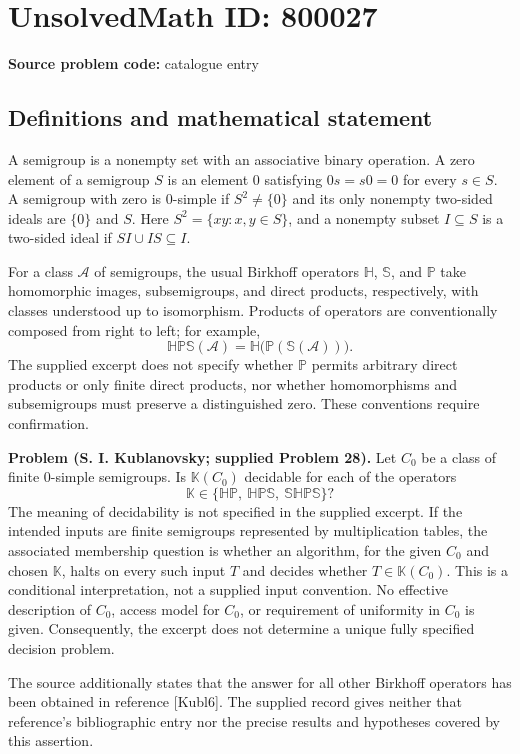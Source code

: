 \documentclass[11pt]{article}
\begin{document}
\section*{UnsolvedMath ID: 800027}
\textbf{Source problem code:} catalogue entry
\subsection{Definitions and mathematical statement}
A semigroup is a nonempty set with an associative binary operation. A zero element of a semigroup \(S\) is an element \(0\) satisfying \(0s=s0=0\) for every \(s\in S\). A semigroup with zero is \(0\)-simple if \(S^2\ne\{0\}\) and its only nonempty two-sided ideals are \(\{0\}\) and \(S\). Here \(S^2=\{xy:x,y\in S\}\), and a nonempty subset \(I\subseteq S\) is a two-sided ideal if \(SI\cup IS\subseteq I\).

For a class \(\mathcal A\) of semigroups, the usual Birkhoff operators \(\mathbb H\), \(\mathbb S\), and \(\mathbb P\) take homomorphic images, subsemigroups, and direct products, respectively, with classes understood up to isomorphism. Products of operators are conventionally composed from right to left; for example,
\[
\mathbb H\mathbb P\mathbb S(\mathcal A)
=\mathbb H\bigl(\mathbb P(\mathbb S(\mathcal A))\bigr).
\]
The supplied excerpt does not specify whether \(\mathbb P\) permits arbitrary direct products or only finite direct products, nor whether homomorphisms and subsemigroups must preserve a distinguished zero. These conventions require confirmation.

\textbf{Problem (S. I. Kublanovsky; supplied Problem 28).} Let \(C_0\) be a class of finite \(0\)-simple semigroups. Is \(\mathbb K(C_0)\) decidable for each of the operators
\[
\mathbb K\in\bigl\{\mathbb H\mathbb P,\ \mathbb H\mathbb P\mathbb S,\ \mathbb S\mathbb H\mathbb P\mathbb S\bigr\}?
\]
The meaning of decidability is not specified in the supplied excerpt. If the intended inputs are finite semigroups represented by multiplication tables, the associated membership question is whether an algorithm, for the given \(C_0\) and chosen \(\mathbb K\), halts on every such input \(T\) and decides whether \(T\in\mathbb K(C_0)\). This is a conditional interpretation, not a supplied input convention. No effective description of \(C_0\), access model for \(C_0\), or requirement of uniformity in \(C_0\) is given. Consequently, the excerpt does not determine a unique fully specified decision problem.

The source additionally states that the answer for all other Birkhoff operators has been obtained in reference [Kubl6]. The supplied record gives neither that reference's bibliographic entry nor the precise results and hypotheses covered by this assertion.
\end{document}
